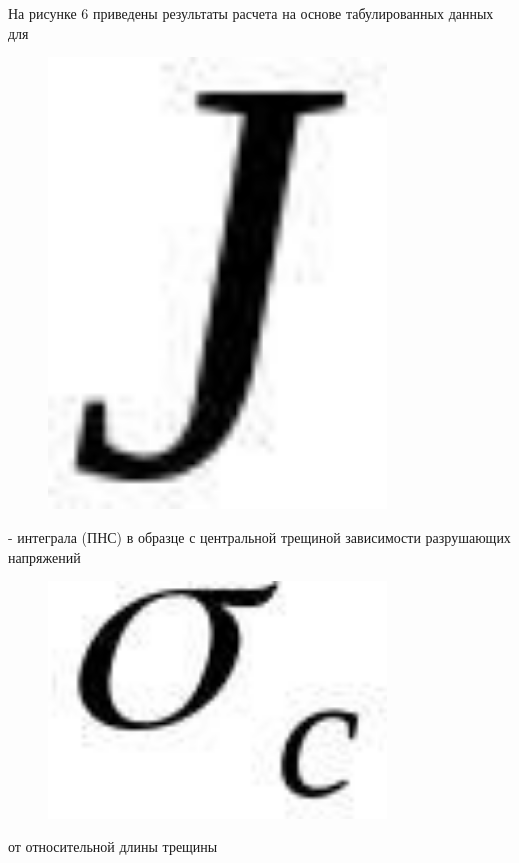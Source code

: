 На рисунке 6 приведены результаты расчета на основе табулированных
данных для \begin{figure}[H]
	\centering
	\includegraphics[width=0.8\textwidth]{assets/1178}
	\caption*{}
\end{figure}- интеграла (ПНС) в
образце с центральной трещиной зависимости разрушающих напряжений
\begin{figure}[H]
	\centering
	\includegraphics[width=0.8\textwidth]{assets/1179}
	\caption*{}
\end{figure} от относительной длины трещины
